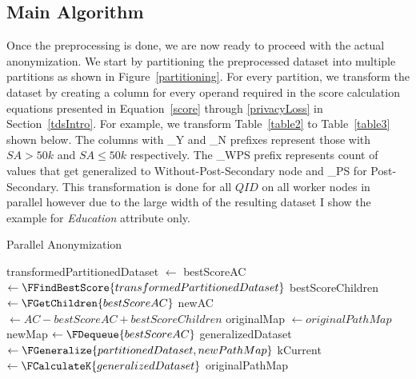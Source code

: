 \documentclass[11pt]{article}       %
\begin{document}
\subsection{Main Algorithm}

Once the preprocessing is done, we are now ready to proceed with the actual anonymization. We start by partitioning the preprocessed dataset into multiple partitions as shown in Figure~\ref{partitioning}. For every partition, we transform the dataset by creating a column for every operand required in the score calculation equations presented in Equation~\ref{score} through \ref{privacyLoss} in Section~\ref{tdsIntro}. For example, we transform Table~\ref{table2} to Table~\ref{table3} shown below. The columns with \_Y and \_N prefixes represent those with \(SA > 50k\) and \(SA \leq 50k\) respectively. The \_WPS prefix represents count of values that get generalized to Without-Post-Secondary node and \_PS for Post-Secondary. This transformation is done for all $QID$ on all worker nodes in parallel however due to the large width of the resulting dataset I show the example for \emph{Education} attribute only.

\begin{algorithm}[h]
\label{tdsImplemented}
\caption{Parallel Anonymization}

 {
  transformedPartitionedDataset $\leftarrow$ \;
  bestScoreAC $\leftarrow \FFindBestScore{transformedPartitionedDataset}$\;
  bestScoreChildren $\leftarrow \FGetChildren{bestScoreAC}$\;
  newAC $\leftarrow AC - bestScoreAC + bestScoreChildren$\;
  originalMap $\leftarrow originalPathMap$\;
  newMap $\leftarrow \FDequeue{bestScoreAC}$\;
  generalizedDataset $\leftarrow \FGeneralize{partitionedDataset, newPathMap}$\;
  kCurrent $\leftarrow \FCalculateK{generalizedDataset}$\;
   {
    \KwRet {}
  }
   {
    \KwRet originalPathMap\; 
  }
}

\end{algorithm}
\end{document}
